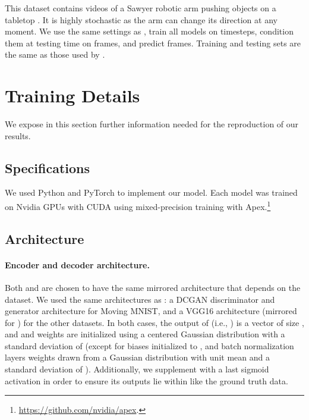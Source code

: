 \documentclass{article}
\begin{document}
This dataset contains  videos of a Sawyer robotic arm pushing objects on a tabletop \citep{Ebert2017}.
It is highly stochastic as the arm can change its direction at any moment.
We use the same settings as \citet{Denton2018}, train all models on  timesteps, condition them at testing time on  frames, and predict  frames.
Training and testing sets are the same as those used by \citet{Denton2018}.


\section{Training Details}
\label{app:Training}

We expose in this section further information needed for the reproduction of our results.

\subsection{Specifications}

We used Python  and PyTorch  \citep{Paszke2019} to implement our model.
Each model was trained on Nvidia GPUs with CUDA  using mixed-precision training \citep{Micikevicius2018} with Apex.\footnote{\url{https://github.com/nvidia/apex}.}

\subsection{Architecture}

\paragraph{Encoder and decoder architecture.}

Both  and  are chosen to have the same mirrored architecture that depends on the dataset.
We used the same architectures as \citet{Denton2018}: a DCGAN discriminator and generator architecture \citep{Radford2016} for Moving MNIST, and a VGG16 \citep{Simonyan2015} architecture (mirrored for ) for the other datasets.
In both cases, the output of  (i.e., ) is a vector of size , and  and  weights are initialized using a centered Gaussian distribution with a standard deviation of  (except for biases initialized to , and batch normalization layers weights drawn from a Gaussian distribution with unit mean and a standard deviation of ).
Additionally, we supplement  with a last sigmoid activation in order to ensure its outputs lie within  like the ground truth data.
\end{document}
